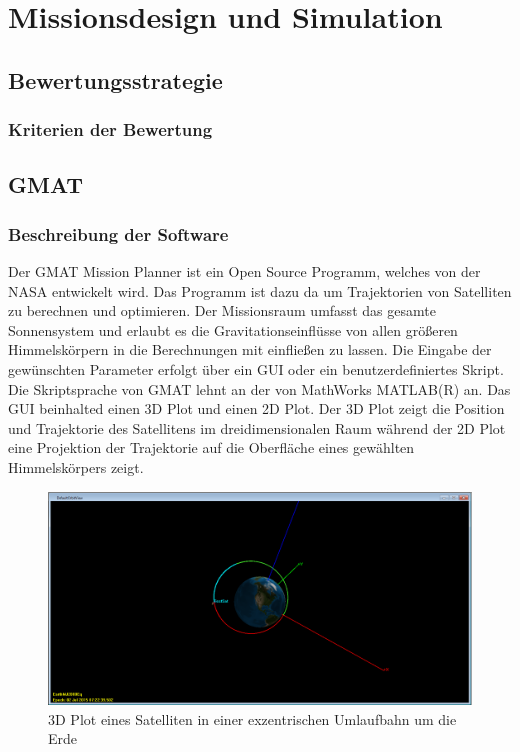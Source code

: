 \chapter{Missionsdesign und Simulation}

\section{Bewertungsstrategie}
		\subsection{Kriterien der Bewertung}
			
		\section{GMAT}
		\subsection{Beschreibung der Software}
		Der GMAT Mission Planner ist ein Open Source Programm, welches von der NASA entwickelt wird. Das Programm ist dazu da um Trajektorien von Satelliten zu berechnen und optimieren. Der Missionsraum umfasst das gesamte Sonnensystem und erlaubt es die Gravitationseinflüsse von allen größeren Himmelskörpern in die Berechnungen mit einfließen zu lassen. 
Die Eingabe der gewünschten Parameter erfolgt über ein GUI oder ein benutzerdefiniertes Skript. Die Skriptsprache von GMAT lehnt an der von MathWorks MATLAB(R) an.
Das GUI beinhalted einen 3D Plot und einen 2D Plot. Der 3D Plot zeigt die Position und Trajektorie des Satellitens im dreidimensionalen Raum während der 2D Plot eine Projektion der Trajektorie auf die Oberfläche eines gewählten Himmelskörpers zeigt.

\begin{figure}[!h]
	\centering
		\includegraphics[width=1.00\textwidth]{graphics/GMAT/GMAT_OrbitView2.PNG}
	\caption{3D Plot eines Satelliten in einer exzentrischen Umlaufbahn um die Erde}
	\label{fig:OrbitView2}
\end{figure}


